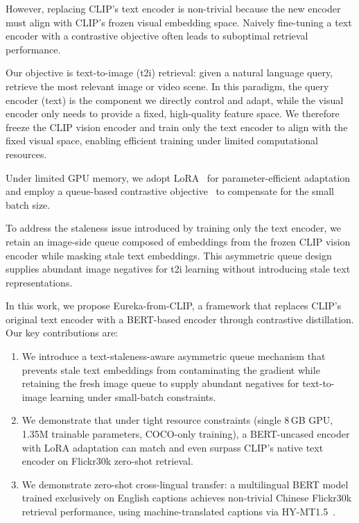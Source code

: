 \documentclass[10pt,leqno]{amsart}
\begin{document}
However, replacing CLIP's text encoder is non-trivial because the new encoder must align with CLIP's frozen visual embedding space. Naively fine-tuning a text encoder with a contrastive objective often leads to suboptimal retrieval performance.

Our objective is text-to-image (t2i) retrieval: given a natural language query, retrieve the most relevant image or video scene. In this paradigm, the query encoder (text) is the component we directly control and adapt, while the visual encoder only needs to provide a fixed, high-quality feature space. We therefore freeze the CLIP vision encoder and train only the text encoder to align with the fixed visual space, enabling efficient training under limited computational resources.

Under limited GPU memory, we adopt LoRA~\citep{hu2022lora} for parameter-efficient adaptation and employ a queue-based contrastive objective~\citep{he2020moco} to compensate for the small batch size.

To address the staleness issue introduced by training only the text encoder, we retain an image-side queue composed of embeddings from the frozen CLIP vision encoder while masking stale text embeddings. This asymmetric queue design supplies abundant image negatives for t2i learning without introducing stale text representations.

In this work, we propose Eureka-from-CLIP, a framework that replaces CLIP's original text encoder with a BERT-based encoder \citep{devlin2019bert} through contrastive distillation. Our key contributions are:

\begin{enumerate}
    \item We introduce a text-staleness-aware asymmetric queue mechanism that prevents stale text embeddings from contaminating the gradient while retaining the fresh image queue to supply abundant negatives for text-to-image learning under small-batch constraints.
    \item We demonstrate that under tight resource constraints (single 8\,GB GPU, 1.35M trainable parameters, COCO-only training), a BERT-uncased encoder with LoRA adaptation can match and even surpass CLIP's native text encoder on Flickr30k zero-shot retrieval.
    \item We demonstrate zero-shot cross-lingual transfer: a multilingual BERT model trained exclusively on English captions achieves non-trivial Chinese Flickr30k retrieval performance, using machine-translated captions via HY-MT1.5~\citep{hymt152025tencent}.
\end{enumerate}
\end{document}
